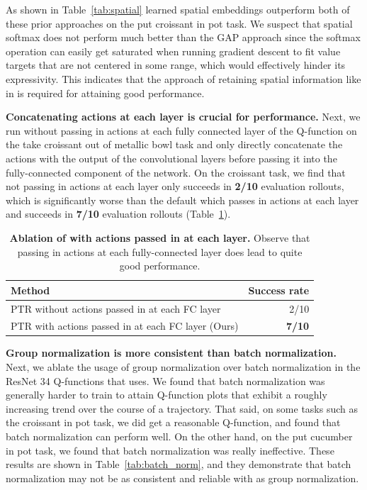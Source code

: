 \documentclass[conference]{IEEEtran}
\begin{document}
As shown in {Table~\ref{tab:spatial}} learned spatial embeddings outperform both of these prior approaches on the put croissant in pot task. We suspect that spatial softmax does not perform much better than the GAP approach since the softmax operation can easily get saturated when running gradient descent to fit value targets that are not centered in some range, which would effectively hinder its expressivity. This indicates that the approach of retaining spatial information like in \methodname is required for attaining good performance.

\textbf{Concatenating actions at each layer is crucial for performance.} Next, we run \methodname without passing in actions at each fully connected layer of the Q-function on the take croissant out of metallic bowl task and only directly concatenate the actions with the output of the convolutional layers before passing it into the fully-connected component of the network. On the croissant task, we find that not passing in actions at each layer only succeeds in \textbf{2/10} evaluation rollouts, which is significantly worse than the default \methodname which passes in actions at each layer and succeeds in \textbf{7/10} evaluation rollouts (Table~\ref{tab:action_sep}).

\begin{table}[h]
\centering
\begin{tabular}{l|r}
\toprule
\textbf{Method} & \textbf{Success rate}\\  \midrule
PTR without actions passed in at each FC layer & 2/10 \\
PTR with actions passed in at each FC layer (Ours) & \textbf{7/10} \\
\bottomrule
\end{tabular}
\vspace{0.1cm}
\caption{\footnotesize{\textbf{Ablation of \methodname with actions passed in at each layer.} Observe that passing in actions at each fully-connected layer does lead to quite good performance.}}
\label{tab:action_sep}
\end{table}

\textbf{Group normalization is more consistent than batch normalization.} Next, we ablate the usage of group normalization over batch normalization in the ResNet 34 Q-functions that \methodname uses. We found that batch normalization was generally harder to train to attain Q-function plots that exhibit a roughly increasing trend over the course of a trajectory. That said, on some tasks such as the croissant in pot task, we did get a reasonable Q-function, and found that batch normalization can perform well. On the other hand, on the put cucumber in pot task, we found that batch normalization was really ineffective. These results are shown in {Table~\ref{tab:batch_norm}}, and they demonstrate that batch normalization may not be as consistent and reliable with \methodname as group normalization.
\end{document}
